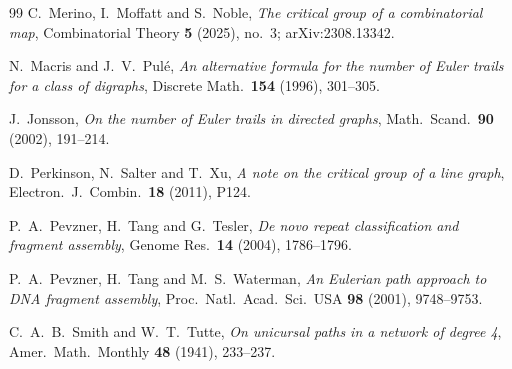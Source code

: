 \documentclass[11pt]{article}
\theoremstyle{plain}
\theoremstyle{definition}
\theoremstyle{remark}
\begin{document}
\begin{thebibliography}{99}
 C.~Merino, I.~Moffatt and S.~Noble,
\emph{The critical group of a combinatorial map},
Combinatorial Theory \textbf{5} (2025), no.~3; arXiv:2308.13342.

 N.~Macris and J.~V.~Pul\'e,
\emph{An alternative formula for the number of Euler trails for a class of digraphs},
Discrete Math.\ \textbf{154} (1996), 301--305.

 J.~Jonsson,
\emph{On the number of Euler trails in directed graphs},
Math.\ Scand.\ \textbf{90} (2002), 191--214.

 D.~Perkinson, N.~Salter and T.~Xu,
\emph{A note on the critical group of a line graph},
Electron.\ J.\ Combin.\ \textbf{18} (2011), P124.

 P.~A.~Pevzner, H.~Tang and G.~Tesler,
\emph{De novo repeat classification and fragment assembly},
Genome Res.\ \textbf{14} (2004), 1786--1796.

 P.~A.~Pevzner, H.~Tang and M.~S.~Waterman,
\emph{An Eulerian path approach to DNA fragment assembly},
Proc.\ Natl.\ Acad.\ Sci.\ USA \textbf{98} (2001), 9748--9753.

 C.~A.~B.~Smith and W.~T.~Tutte,
\emph{On unicursal paths in a network of degree 4},
Amer.\ Math.\ Monthly \textbf{48} (1941), 233--237.

\end{thebibliography}
\end{document}
